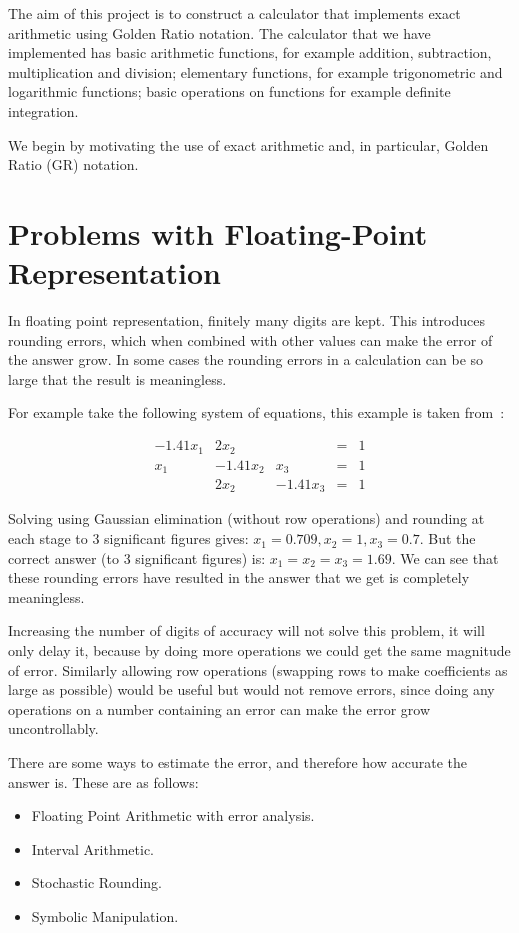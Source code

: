 \documentclass{cs4rep}
\begin{document}
The aim of this project is to construct a calculator that implements
exact arithmetic using Golden Ratio notation. The calculator that we
have implemented has basic arithmetic functions, for example addition,
subtraction, multiplication and division; elementary functions, for
example trigonometric and logarithmic functions; basic operations on
functions for example definite integration.

We begin by motivating the use of exact arithmetic and, in particular,
Golden Ratio (GR) notation.

\section{Problems with Floating-Point Representation}

In floating point representation, finitely many digits are kept.  This
introduces rounding errors, which when combined with other values can
make the error of the answer grow.  In some cases the rounding errors
in a calculation can be so large that the result is meaningless.

For example take the following system of equations, this example is
taken from~\cite{kn:Hall}:

\begin{center}
\[
\begin{array}{ccccc}
-1.41x_{1} & 2x_{2} & & = & 1 \\
x_{1} & -1.41x_{2} & x_{3} & = & 1 \\
 & 2x_{2} & -1.41x_{3} & = & 1
\end{array}
\]
\end{center}

Solving using Gaussian elimination (without row operations) and
rounding at each stage to 3 significant figures gives: \( x_{1}=0.709,
x_{2}=1, x_{3}=0.7.\) But the correct answer (to 3 significant
figures) is: \( x_{1}=x_{2}=x_{3}=1.69. \) We can see that these
rounding errors have resulted in the answer that we get is completely
meaningless.

Increasing the number of digits of accuracy will not solve this
problem, it will only delay it, because by doing more operations we
could get the same magnitude of error.  Similarly allowing row
operations (swapping rows to make coefficients as large as possible)
would be useful but would not remove errors, since doing any
operations on a number containing an error can make the error grow
uncontrollably.

There are some ways to estimate the error, and therefore how accurate
the answer is. These are as follows:
\begin{itemize}
\item Floating Point Arithmetic with error analysis.
\item Interval Arithmetic.
\item Stochastic Rounding.
\item Symbolic Manipulation.
\end{itemize}
\end{document}
